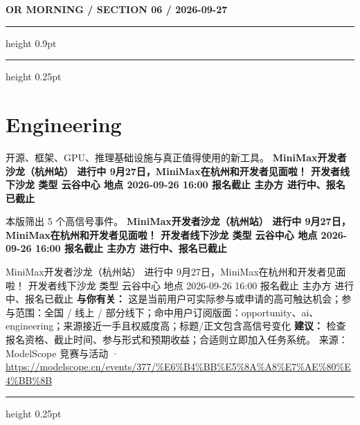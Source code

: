 \documentclass[10.5pt]{ctexart}
\begin{document}
\newpage
{\small\bfseries OR MORNING / SECTION 06 / 2026-09-27}
\vspace{2mm}
\hrule height 0.9pt
\vspace{1.5mm}
\hrule height 0.25pt
\vspace{4mm}
\section*{Engineering}
{\color{ormuted} 开源、框架、GPU、推理基础设施与真正值得使用的新工具。}
\vspace{2mm}
{\LARGE\bfseries MiniMax开发者沙龙（杭州站） 进行中 9月27日，MiniMax在杭州和开发者见面啦！ 开发者线下沙龙 类型 云谷中心 地点 2026-09-26 16:00 报名截止 主办方 进行中、报名已截止}\par
\vspace{1mm}
{\color{ormuted} 本版筛出 5 个高信号事件。}
\vspace{3mm}
{\Large\bfseries MiniMax开发者沙龙（杭州站） 进行中 9月27日，MiniMax在杭州和开发者见面啦！ 开发者线下沙龙 类型 云谷中心 地点 2026-09-26 16:00 报名截止 主办方 进行中、报名已截止}\par
MiniMax开发者沙龙（杭州站） 进行中 9月27日，MiniMax在杭州和开发者见面啦！ 开发者线下沙龙 类型 云谷中心 地点 2026-09-26 16:00 报名截止 主办方 进行中、报名已截止
\textbf{与你有关：} 这是当前用户可实际参与或申请的高可触达机会；参与范围：全国 / 线上 / 部分线下；命中用户订阅版面：opportunity、ai、engineering；来源接近一手且权威度高；标题/正文包含高信号变化
\textbf{建议：} 检查报名资格、截止时间、参与形式和预期收益；合适则立即加入任务系统。
{\footnotesize\color{ormuted} 来源：ModelScope 竞赛与活动 · \url{https://modelscope.cn/events/377/%E6%B4%BB%E5%8A%A8%E7%AE%80%E4%BB%8B}}
\vspace{4mm}
\hrule height 0.25pt
\vspace{3mm}
\end{document}
